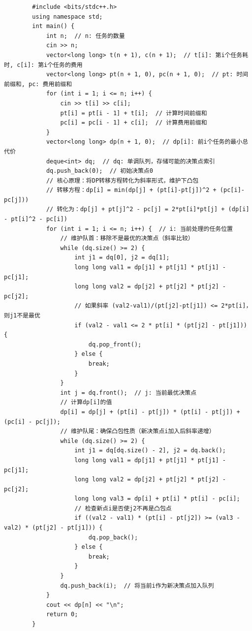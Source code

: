 \documentclass[12pt,a4paper]{ctexart}
\begin{document}
	\begin{lstlisting}
		#include <bits/stdc++.h>
		using namespace std;
		int main() {
			int n;  // n: 任务的数量
			cin >> n;
			vector<long long> t(n + 1), c(n + 1);  // t[i]: 第i个任务耗时, c[i]: 第i个任务的费用
			vector<long long> pt(n + 1, 0), pc(n + 1, 0);  // pt: 时间前缀和, pc: 费用前缀和
			for (int i = 1; i <= n; i++) {
				cin >> t[i] >> c[i];
				pt[i] = pt[i - 1] + t[i];  // 计算时间前缀和
				pc[i] = pc[i - 1] + c[i];  // 计算费用前缀和
			}
			vector<long long> dp(n + 1, 0);  // dp[i]: 前i个任务的最小总代价
			deque<int> dq;  // dq: 单调队列，存储可能的决策点索引
			dq.push_back(0);  // 初始决策点0
			// 核心原理：将DP转移方程转化为斜率形式，维护下凸包
			// 转移方程：dp[i] = min(dp[j] + (pt[i]-pt[j])^2 + (pc[i]-pc[j]))
			// 转化为：dp[j] + pt[j]^2 - pc[j] = 2*pt[i]*pt[j] + (dp[i] - pt[i]^2 - pc[i])
			for (int i = 1; i <= n; i++) {  // i: 当前处理的任务位置
				// 维护队首：移除不是最优的决策点（斜率比较）
				while (dq.size() >= 2) {
					int j1 = dq[0], j2 = dq[1];
					long long val1 = dp[j1] + pt[j1] * pt[j1] - pc[j1];
					long long val2 = dp[j2] + pt[j2] * pt[j2] - pc[j2];
					// 如果斜率 (val2-val1)/(pt[j2]-pt[j1]) <= 2*pt[i]，则j1不是最优
					if (val2 - val1 <= 2 * pt[i] * (pt[j2] - pt[j1])) {
						dq.pop_front();
					} else {
						break;
					}
				}
				int j = dq.front();  // j: 当前最优决策点
				// 计算dp[i]的值
				dp[i] = dp[j] + (pt[i] - pt[j]) * (pt[i] - pt[j]) + (pc[i] - pc[j]);
				// 维护队尾：确保凸包性质（新决策点i加入后斜率递增）
				while (dq.size() >= 2) {
					int j1 = dq[dq.size() - 2], j2 = dq.back();
					long long val1 = dp[j1] + pt[j1] * pt[j1] - pc[j1];
					long long val2 = dp[j2] + pt[j2] * pt[j2] - pc[j2];
					long long val3 = dp[i] + pt[i] * pt[i] - pc[i];
					// 检查新点i是否使j2不再是凸包点
					if ((val2 - val1) * (pt[i] - pt[j2]) >= (val3 - val2) * (pt[j2] - pt[j1])) {
						dq.pop_back();
					} else {
						break;
					}
				}
				dq.push_back(i);  // 将当前i作为新决策点加入队列
			}
			cout << dp[n] << "\n";
			return 0;
		}
	\end{lstlisting}
	
	\newpage
\end{document}
